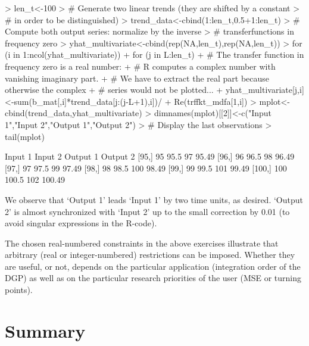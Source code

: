 \documentclass[a4paper]{book}
\begin{document}
\begin{enumerate}
\begin{itemize}
\begin{Schunk}
\begin{Sinput}
> len_t<-100
> # Generate two linear trends (they are shifted by a constant 
> # in order to be distinguished)
> trend_data<-cbind(1:len_t,0.5+1:len_t)
> # Compute both output series: normalize by the inverse 
> #   transferfunctions in frequency zero
> yhat_multivariate<-cbind(rep(NA,len_t),rep(NA,len_t))
> for (i in 1:ncol(yhat_multivariate))
+   for (j in L:len_t)
+ #  The transfer function in frequency zero is a real number: 
+ #   R computes a complex number with vanishing imaginary part. 
+ #   We have to extract the real part because otherwise the complex 
+ #   series would not be plotted... 
+     yhat_multivariate[j,i]<-sum(b_mat[,i]*trend_data[j:(j-L+1),i])/
+       Re(trffkt_mdfa[1,i])
> mplot<-cbind(trend_data,yhat_multivariate)
> dimnames(mplot)[[2]]<-c("Input 1","Input 2","Output 1","Output 2")
> # Display the last observations
> tail(mplot)
\end{Sinput}
\begin{Soutput}
       Input 1 Input 2 Output 1 Output 2
 [95,]      95    95.5       97    95.49
 [96,]      96    96.5       98    96.49
 [97,]      97    97.5       99    97.49
 [98,]      98    98.5      100    98.49
 [99,]      99    99.5      101    99.49
[100,]     100   100.5      102   100.49
\end{Soutput}
\end{Schunk}
We observe that `Output 1' leads `Input 1' by two time units, as desired. `Output 2' is almost synchronized with `Input 2'  up to the small correction by 0.01 (to avoid singular expressions in the R-code). 

\end{itemize}

\end{enumerate}
The chosen real-numbered constraints in the above exercises illustrate that arbitrary (real or integer-numbered) restrictions can be imposed. Whether they are useful, or not, depends on the particular application (integration order of the DGP) as well as on the particular research priorities of the user (MSE or turning points). 


\section{Summary}
\end{document}
